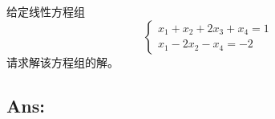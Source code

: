 \begin{example}[线性方程组求解]
    给定线性方程组  
    \[
    \begin{cases}
    x_1 + x_2 + 2x_3 + x_4 = 1 \\
    x_1 - 2x_2 - x_4 = -2
    \end{cases}
    \]
    请求解该方程组的解。
    \end{example}
    
    \subsection*{Ans:}
      